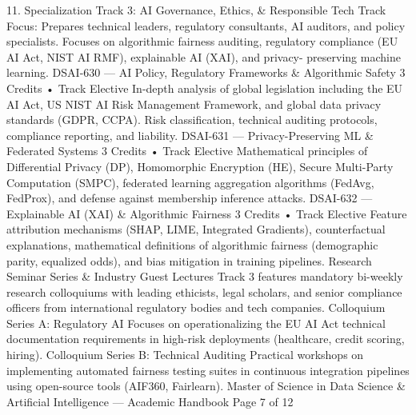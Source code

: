 11. Specialization Track 3: AI Governance, Ethics, \& Responsible Tech
Track Focus: Prepares technical leaders, regulatory consultants, AI auditors, and policy specialists. Focuses on
algorithmic fairness auditing, regulatory compliance (EU AI Act, NIST AI RMF), explainable AI (XAI), and privacy-
preserving machine learning.
DSAI-630 — AI Policy, Regulatory Frameworks \& Algorithmic Safety
3 Credits • Track Elective
In-depth analysis of global legislation including the EU AI Act, US NIST AI Risk Management Framework, and
global data privacy standards (GDPR, CCPA). Risk classification, technical auditing protocols, compliance
reporting, and liability.
DSAI-631 — Privacy-Preserving ML \& Federated Systems
3 Credits • Track Elective
Mathematical principles of Differential Privacy (DP), Homomorphic Encryption (HE), Secure Multi-Party
Computation (SMPC), federated learning aggregation algorithms (FedAvg, FedProx), and defense against
membership inference attacks.
DSAI-632 — Explainable AI (XAI) \& Algorithmic Fairness
3 Credits • Track Elective
Feature attribution mechanisms (SHAP, LIME, Integrated Gradients), counterfactual explanations, mathematical
definitions of algorithmic fairness (demographic parity, equalized odds), and bias mitigation in training pipelines.
Research Seminar Series \& Industry Guest Lectures
Track 3 features mandatory bi-weekly research colloquiums with leading ethicists, legal scholars, and senior
compliance officers from international regulatory bodies and tech companies.
Colloquium Series A: Regulatory AI
Focuses on operationalizing the EU AI Act technical
documentation requirements in high-risk deployments
(healthcare, credit scoring, hiring).
Colloquium Series B: Technical Auditing
Practical workshops on implementing automated fairness
testing suites in continuous integration pipelines using
open-source tools (AIF360, Fairlearn).
Master of Science in Data Science \& Artificial Intelligence — Academic Handbook
Page 7 of 12

